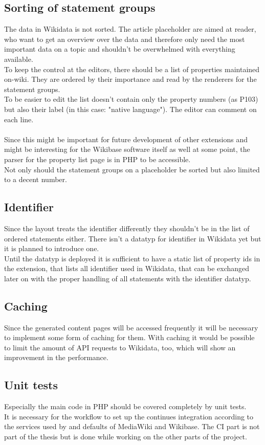 \documentclass[11pt]{article}
\begin{document}
  \subsection{Sorting of statement groups}
  The data in Wikidata is not sorted. The article placeholder are aimed at reader, who want to get an overview over the data and therefore only need the most important data on a topic and shouldn't be overwhelmed with everything available. 
  \\
  To keep the control at the editors, there should be a list of properties maintained on-wiki. They are ordered by their importance and read by the renderers for the statement groups. \\
  To be easier to edit the list doesn't contain only the property numbers (as P103) but also their label (in this case: "native language"). The editor can comment on each line. \\
  \\
  Since this might be important for future development of other extensions and might be interesting for the Wikibase software itself as well at some point, the parser for the property list page is in PHP to be accessible. \\
  Not only should the statement groups on a placeholder be sorted but also limited to a decent number.

  \subsection {Identifier}
  Since the layout treats the identifier differently they shouldn't be in the list of ordered statements either. There isn't a datatyp for identifier in Wikidata yet but it is planned to introduce one. \\
  Until the datatyp is deployed it is sufficient to have a static list of property ids in the extension, that lists all identifier used in Wikidata, that can be exchanged later on with the proper handling of all statements with the identifier datatyp.

  \subsection{Caching}
  Since the generated content pages will be accessed frequently it will be necessary to implement some form of caching for them. With caching it would be possible to limit the amount of API requests to Wikidata, too, which will show an improvement in the performance. 

  \subsection {Unit tests}
  Especially the main code in PHP should be covered completely by unit tests.\\
  It is necessary for the workflow to set up the continues integration according to the services used by and defaults of MediaWiki and Wikibase. The CI part is not part of the thesis but is done while working on the other parts of the project.
\end{document}
